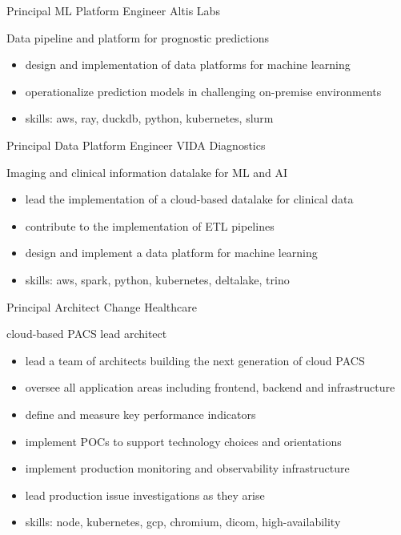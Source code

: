 \documentclass[print]{friggeri-cv}
\begin{document}
\begin{entrylist}
  {Principal ML Platform Engineer} {Altis Labs}
  {Data pipeline and platform for prognostic predictions
  \begin{itemize}
    \item design and implementation of data platforms for machine learning
    \item operationalize prediction models in challenging on-premise environments
    \item skills: aws, ray, duckdb, python, kubernetes, slurm
  \end{itemize}}

  {Principal Data Platform Engineer} {VIDA Diagnostics}
  {Imaging and clinical information datalake for ML and AI
  \begin{itemize}
    \item lead the implementation of a cloud-based datalake for clinical data
    \item contribute to the implementation of ETL pipelines
    \item design and implement a data platform for machine learning
    \item skills: aws, spark, python, kubernetes, deltalake, trino
  \end{itemize}}

  {Principal Architect} {Change Healthcare}
  {cloud-based PACS lead architect
  \begin{itemize}
    \item lead a team of architects building the next generation of cloud PACS
    \item oversee all application areas including frontend, backend and infrastructure
    \item define and measure key performance indicators
    \item implement POCs to support technology choices and orientations
    \item implement production monitoring and observability infrastructure
    \item lead production issue investigations as they arise
    \item skills: node, kubernetes, gcp, chromium, dicom, high-availability
  \end{itemize}}



\end{entrylist}

\clearpage
\end{document}
